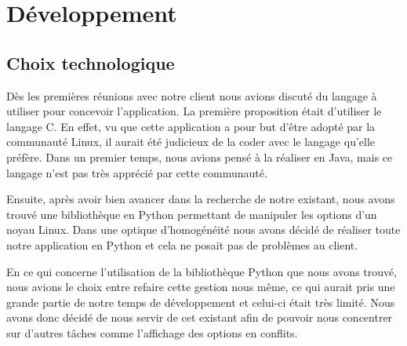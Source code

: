 \documentclass[16pts]{report}
\begin{document}

\nocite{*}

\chapter{Développement}
\label{cha:Développement}

\section{Choix technologique}
\label{sec:Choix technologique}

Dès les premières réunions avec notre client nous avions discuté du langage à 
utiliser pour concevoir l'application. La première proposition était d'utiliser 
le langage C. En effet, vu que cette application a pour but d'être adopté par 
la communauté Linux, il aurait été judicieux de la coder avec le langage 
qu'elle préfère. Dans un premier temps, nous avions pensé à la réaliser 
en Java, mais ce langage n'est pas très apprécié par cette communauté.

Ensuite, après avoir bien avancer dans la recherche de notre existant, nous 
avons trouvé une bibliothèque en Python permettant de manipuler les options 
d'un noyau Linux. Dans une optique d'homogénéité nous avons décidé de réaliser 
toute notre application en Python et cela ne posait pas de problèmes au client.

En ce qui concerne l'utilisation de la bibliothèque Python que nous avons 
trouvé, nous avions le choix entre refaire cette gestion nous même, ce qui 
aurait pris une grande partie de notre temps de développement et celui-ci
était très limité. Nous avons donc décidé de nous servir de cet existant
afin de pouvoir nous concentrer sur d'autres tâches comme l'affichage
des options en conflits.
\end{document}
